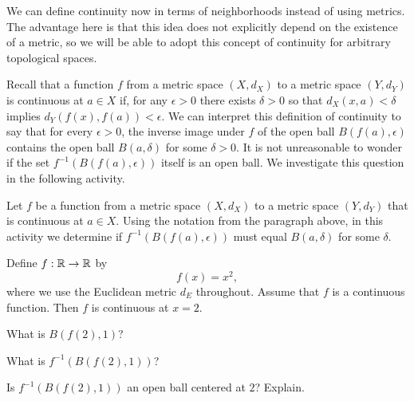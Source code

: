 \begin{comment}

\ActivitySolution
\ba
\item We need to show that there is an open ball around $b$ that is entirely contained in $B(a, \delta)$. 


\item Let $\beta = d(a,b)$ and let $\gamma = \delta - \beta$. Let $c \in B(b,\gamma)$. Then 
\[d(a,c) \leq d(a,b) + d(b,c) < \beta + \gamma = \beta + (\delta - \beta) = \delta.\]
So $c \in B(a,\delta)$ and $B(b,\gamma) \subset B(a,\delta)$.  

\item This statement is not true. Consider $A = (0,1) \cup (2,3)$ as a subset of $\R$ with the Euclidean metric. The set $A$ is a neighborhood of each of its points, but $A$ is not an open ball -- rather $A$ is the union of two disjoint open balls. 

\ea

\end{comment}

We can define continuity now in terms of neighborhoods instead of using metrics. The advantage here is that this idea does not explicitly depend on the existence of a metric, so we will be able to adopt this concept of continuity for arbitrary topological spaces. 

Recall that a function $f$ from a metric space $(X, d_X)$ to a metric space $(Y, d_Y)$ is continuous at $a \in X$ if, for any $\epsilon > 0$ there exists $\delta > 0$ so that $d_X(x,a) < \delta$ implies $d_Y(f(x),f(a)) < \epsilon$. We can interpret this definition of continuity to say that for every $\epsilon > 0$, the inverse image under $f$ of the open ball $B(f(a), \epsilon)$ contains the open ball $B(a, \delta)$ for some $\delta > 0$. It is not unreasonable to wonder if the set $f^{-1}\left(B(f(a), \epsilon)\right)$ itself is an open ball. We investigate this question in the following activity. 

\begin{activity} \label{act:OB_1} Let $f$ be a function from a metric space $(X, d_X)$ to a metric space $(Y, d_Y)$ that is continuous at $a \in X$. Using the notation from the paragraph above, in this activity we determine if $f^{-1}\left(B(f(a), \epsilon)\right)$ must equal $B(a, \delta)$ for some $\delta$.

Define $f : \mathbb{R} \to \mathbb{R}$ by 
\[f(x) = x^2,\]
where we use the Euclidean metric $d_E$ throughout.  Assume that $f$ is a continuous function.  Then $f$ is continuous at $x=2$.
\ba
\item What is $B(f(2), 1)$? 

\item What is $f^{-1}\left(B(f(2), 1)\right)$?

\item Is $f^{-1}\left(B(f(2), 1)\right)$ an open ball centered at $2$? Explain.

\ea

\end{activity}
 
